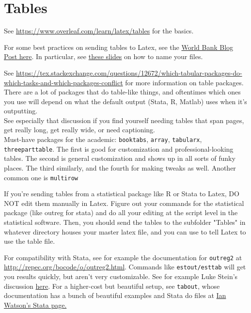\section{Tables}\label{tables_basics}

See \url{https://www.overleaf.com/learn/latex/tables} for the basics.


For some best practices on sending tables to Latex, see the \href{https://blogs.worldbank.org/impactevaluations/nice-and-fast-tables-stata}{World Bank Blog Post here}. In particular, see \href{http://www2.stat.duke.edu/~rcs46/lectures_2015/01-markdown-git/slides/naming-slides/naming-slides.pdf}{these slides} on how to name your files.


See \url{https://tex.stackexchange.com/questions/12672/which-tabular-packages-do-which-tasks-and-which-packages-conflict} for more information on table packages. There are a lot of packages that do table-like things, and oftentimes which ones you use will depend on what the default output (Stata, R, Matlab) uses when it's outputting.\\

See especially that discussion if you find yourself needing tables that span pages, get really long, get really wide, or need captioning.\\

Must-have packages for the academic: \verb+booktabs+, \verb+array+, \verb+tabularx+, \verb+threeparttable+. The first is good for customization and professional-looking tables. The second is general customization and shows up in all sorts of funky places. The third similarly, and the fourth for making tweaks as well. Another common one is \verb+multirow+

If you're sending tables from a statistical package like R or Stata to Latex, DO NOT edit them manually in Latex. Figure out your commands for the statistical package (like outreg for stata) and do all your editing at the script level in the statistical software. Then, you should send the tables to the subfolder "Tables" in whatever directory houses your master latex file, and you can use \verb++ to tell Latex to use the table file. 

For compatibility with Stata, see for example the documentation for \verb+outreg2+ at \url{http://repec.org/bocode/o/outreg2.html}. Commands like \verb+estout/esttab+ will get you results quickly, but aren't very customizable. See for example Luke Stein's discussion \href{https://lukestein.github.io/stata-latex-workflows/}{here}. For a higher-cost but beautiful setup, see \verb+tabout+, whose documentation has a bunch of beautiful examples and Stata do files at \href{http://ianwatson.com.au/stata.html}{Ian Watson's Stata page.}

